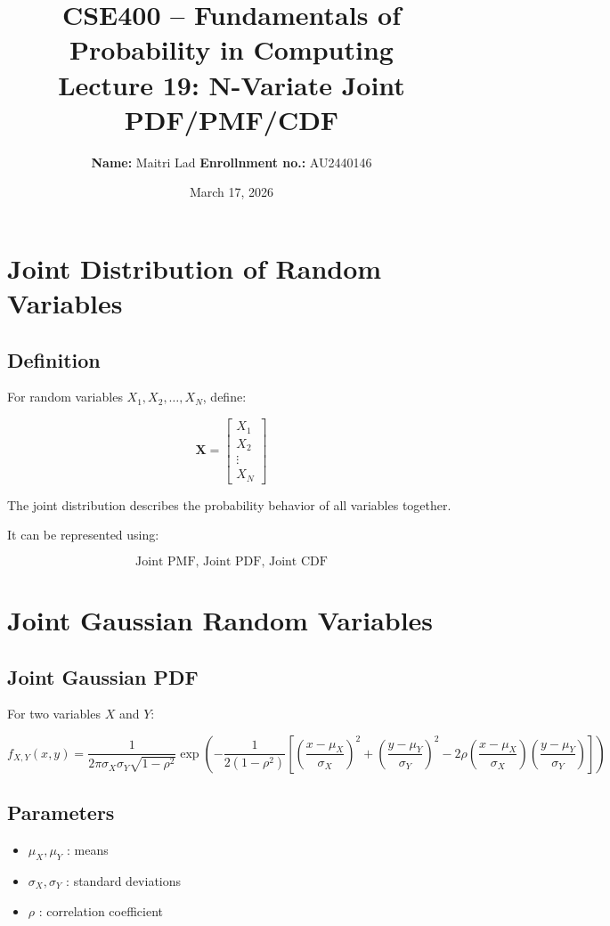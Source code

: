 \documentclass[11pt]{article}
\title{\textbf{CSE400 -- Fundamentals of Probability in Computing}\\
\large Lecture 19: N-Variate Joint PDF/PMF/CDF}
\author{\textbf{Name:} Maitri Lad
\textbf{Enrollnment no.:} AU2440146}
\date{March 17, 2026}
\begin{document}
\maketitle

\section{Joint Distribution of Random Variables}

\subsection{Definition}

For random variables $X_1, X_2, \dots, X_N$, define:

\[
\mathbf{X} =
\begin{bmatrix}
X_1 \\
X_2 \\
\vdots \\
X_N
\end{bmatrix}
\]

The joint distribution describes the probability behavior of all variables together.

It can be represented using:

\[
\text{Joint PMF, Joint PDF, Joint CDF}
\]

\section{Joint Gaussian Random Variables}

\subsection{Joint Gaussian PDF}

For two variables $X$ and $Y$:

\[
f_{X,Y}(x,y)
=
\frac{1}{2\pi \sigma_X \sigma_Y \sqrt{1-\rho^2}}
\exp \left(
-\frac{1}{2(1-\rho^2)}
\left[
\left(\frac{x-\mu_X}{\sigma_X}\right)^2
+
\left(\frac{y-\mu_Y}{\sigma_Y}\right)^2
-
2\rho
\left(\frac{x-\mu_X}{\sigma_X}\right)
\left(\frac{y-\mu_Y}{\sigma_Y}\right)
\right]
\right)
\]

\subsection{Parameters}

\begin{itemize}
\item $\mu_X, \mu_Y$ : means
\item $\sigma_X, \sigma_Y$ : standard deviations
\item $\rho$ : correlation coefficient
\end{itemize}
\end{document}
